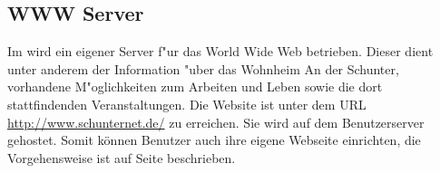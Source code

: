 
\subsection{WWW Server}

Im \snev wird ein eigener \glossar Server f"ur das \glossar World Wide Web
betrieben. Dieser dient unter anderem der Information "uber das Wohnheim An der
Schunter, vorhandene M"oglichkeiten zum Arbeiten und Leben sowie die dort
stattfindenden Veranstaltungen. Die Website ist unter dem URL 
\url{http://www.schunternet.de/} zu erreichen.  Sie wird auf dem
Benutzerserver gehostet. Somit können Benutzer auch ihre eigene
Webseite einrichten, die Vorgehensweise ist auf Seite
\pageref{wwwprivate} beschrieben.




